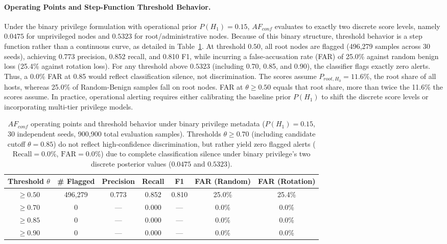 \documentclass[12pt]{article}
\begin{document}
\paragraph{Operating Points and Step-Function Threshold Behavior.}
Under the binary privilege formulation with operational prior $P(H_1) = 0.15$, $AF_{conf}$ evaluates to exactly two discrete score levels, namely $0.0475$ for unprivileged nodes and $0.5323$ for root/administrative nodes. Because of this binary structure, threshold behavior is a step function rather than a continuous curve, as detailed in Table~\ref{tab:far}. At threshold $0.50$, all root nodes are flagged (496,279 samples across 30 seeds), achieving 0.773 precision, 0.852 recall, and 0.810 F1, while incurring a false-accusation rate (FAR) of 25.0\% against random benign loss (25.4\% against rotation loss). For any threshold above $0.5323$ (including 0.70, 0.85, and 0.90), the classifier flags exactly zero alerts. Thus, a 0.0\% FAR at 0.85 would reflect classification silence, not discrimination. The scores assume $P_{root,H_0} = 11.6\%$, the root share of all hosts, whereas 25.0\% of Random-Benign samples fall on root nodes. FAR at $\theta \ge 0.50$ equals that root share, more than twice the 11.6\% the scores assume. In practice, operational alerting requires either calibrating the baseline prior $P(H_1)$ to shift the discrete score levels or incorporating multi-tier privilege models.

\begin{table}[t]
\centering
\caption{$AF_{conf}$ operating points and threshold behavior under binary privilege metadata ($P(H_1) = 0.15$, 30 independent seeds, 900,900 total evaluation samples). Thresholds $\theta \ge 0.70$ (including candidate cutoff $\theta = 0.85$) do not reflect high-confidence discrimination, but rather yield zero flagged alerts ($\text{Recall} = 0.0\%$, $\text{FAR} = 0.0\%$) due to complete classification silence under binary privilege's two discrete posterior values ($0.0475$ and $0.5323$).}
\label{tab:far}
\footnotesize
\begin{tabular}{ccccccc}
\toprule
\textbf{Threshold} $\theta$ & \textbf{\# Flagged} & \textbf{Precision} & \textbf{Recall} & \textbf{F1} & \textbf{FAR (Random)} & \textbf{FAR (Rotation)} \\
\midrule
$\ge 0.50$ & 496,279 & 0.773 & 0.852 & 0.810 & 25.0\% & 25.4\% \\
$\ge 0.70$ & 0 & --- & 0.000 & --- & 0.0\% & 0.0\% \\
$\ge 0.85$ & 0 & --- & 0.000 & --- & 0.0\% & 0.0\% \\
$\ge 0.90$ & 0 & --- & 0.000 & --- & 0.0\% & 0.0\% \\
\bottomrule
\end{tabular}
\end{table}
\end{document}
